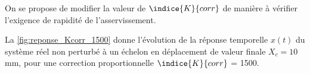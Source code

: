 \ifprof
\else
\vspace*{1em}
On se propose de modifier la valeur de $\indice{K}{corr}$ de manière à vérifier l'exigence de rapidité de l'asservissement.
\fi


\ifprof
{}
\fi

\ifprof
\else
\vspace*{1em}
La \ref{fig:reponse_Kcorr_1500}  donne l'évolution de la réponse temporelle $x(t)$ du système réel non perturbé à un échelon en déplacement de valeur finale $X_c = 10$ mm, pour une correction proportionnelle $\indice{K}{corr}$ = \num{1500}.




%
%

